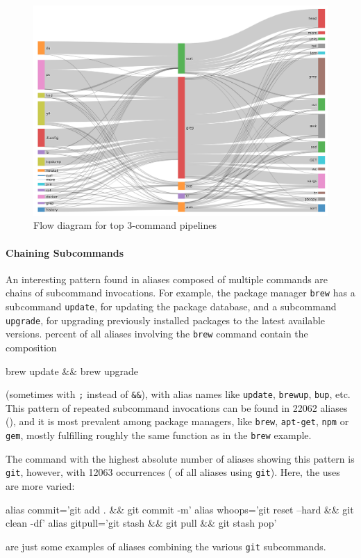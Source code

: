 \begin{figure}[h]
	\centering    
	\includegraphics[width=0.9\linewidth]{figures/flow_250.png}
	\caption{Flow diagram for top 3-command pipelines}
	\label{fig:flow}
\end{figure}


\paragraph{\bf Chaining Subcommands}

An interesting pattern found in aliases composed of multiple commands are chains of subcommand invocations.
For example, the package manager \verb|brew| has a subcommand \verb|update|, for updating the package database, and a subcommand \verb|upgrade|, for upgrading previously installed packages to the latest available versions.
 percent of all aliases involving the \verb|brew| command contain the composition
\begin{CVerbatim}
brew update && brew upgrade
\end{CVerbatim}
(sometimes with \verb|;| instead of \verb|&&|), with alias names like \verb|update|, \verb|brewup|, \verb|bup|, etc.
This pattern of repeated subcommand invocations can be found in \num{22062} aliases (), and it is most prevalent among package managers, like \verb|brew|, \verb|apt-get|, \verb|npm| or \verb|gem|, mostly fulfilling roughly the same function as in the \verb|brew| example.

The command with the highest absolute number of aliases showing this pattern is \verb|git|, however, with \num{12063} occurrences ( of all aliases using \verb|git|).
Here, the uses are more varied:
\begin{CVerbatim}
alias commit='git add . && git commit -m'
alias whoops='git reset --hard && git clean -df'
alias gitpull='git stash && git pull && git stash pop'
\end{CVerbatim}
are just some examples of aliases combining the various \verb|git| subcommands.
